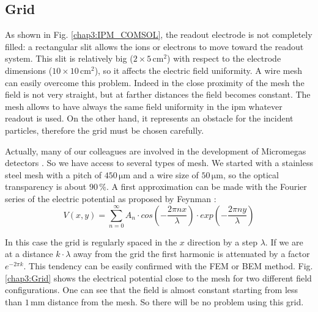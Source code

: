 \begin{refsection}
  \subsection{Grid}
  \label{chap3:sec:grid}
  As shown in Fig. \ref{chap3:IPM_COMSOL}, the readout electrode is not completely filled: a rectangular slit allows the ions or electrons to move toward the readout system. This slit is relatively big ($2\times5\,\mathrm{cm^{2}}$) with respect to the electrode dimensions ($10\times10\,\mathrm{cm^{2}}$), so it affects the electric field uniformity. A wire mesh can easily overcome this problem. Indeed in the close proximity of the mesh the field is not very straight, but at farther distances the field becomes constant. The mesh allows to have always the same field uniformity in the \acrshort{ipm} whatever readout is used. On the other hand, it represents an obstacle for the incident particles, therefore the grid must be chosen carefully.

  Actually, many of our colleagues are involved in the development of Micromegas detectors \cite{GIOMATARIS199629}. So we have access to several types of mesh. We started with a stainless steel mesh with a pitch of $450\,\mathrm{\mu m}$ and a wire size of $50\,\mathrm{\mu m}$, so the optical transparency is about $90\,\mathrm{\%}$. A first approximation can be made with the Fourier series of the electric potential as proposed by Feynman \cite{feynman2011feynman}:
  \begin{equation}
    V(x,y)= \sum^{\infty}_{n=0} A_{n} \cdot cos(-\frac{2\pi n x}{\lambda}) \cdot exp(-\frac{2\pi n y}{\lambda})
  \end{equation}

  In this case the grid is regularly spaced in the $x$ direction by a step $\lambda$. If we are at a distance $k \cdot \lambda$ away from the grid the first harmonic is attenuated by a factor $e^{-2\pi k}$. This tendency can be easily confirmed with the FEM or BEM method. Fig. \ref{chap3:Grid} shows the electrical potential close to the mesh for two different field configurations. One can see that the field is almost constant starting from less than $1\,\mathrm{mm}$ distance from the mesh. So there will be no problem using this grid.

  


\end{refsection}

